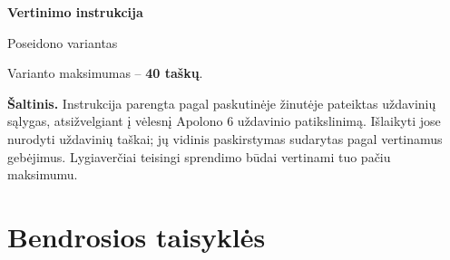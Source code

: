 \documentclass[11pt,a4paper]{article}
\begin{document}
\begin{center}
{\LARGE\bfseries Vertinimo instrukcija}\par
{\large Poseidono variantas}\par
Varianto maksimumas -- \textbf{40 taškų}.
\end{center}
\textbf{Šaltinis.} Instrukcija parengta pagal paskutinėje žinutėje pateiktas uždavinių sąlygas, atsižvelgiant į vėlesnį Apolono 6 uždavinio patikslinimą. Išlaikyti jose nurodyti uždavinių taškai; jų vidinis paskirstymas sudarytas pagal vertinamus gebėjimus. Lygiaverčiai teisingi sprendimo būdai vertinami tuo pačiu maksimumu.

\section*{Bendrosios taisyklės}
\end{document}
